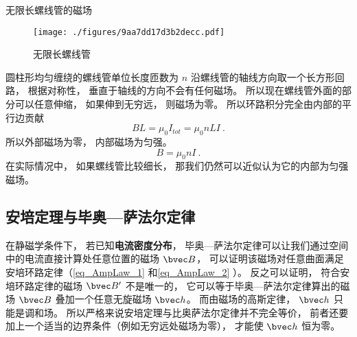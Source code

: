 \begin{example}{无限长螺线管的磁场}\label{ex_AmpLaw_2}
\begin{figure}[ht]
\centering
\texttt{[image: ./figures/9aa7dd17d3b2decc.pdf]}
\caption{无限长螺线管} \label{fig_AmpLaw_1}
\end{figure}
圆柱形均匀缠绕的螺线管单位长度匝数为 $n$ 沿螺线管的轴线方向取一个长方形回路， 根据对称性， 垂直于轴线的方向不会有任何磁场。 所以现在螺线管外面的部分可以任意伸缩， 如果伸到无穷远， 则磁场为零。 所以环路积分完全由内部的平行边贡献
\begin{equation}
BL = \mu_0 I_{tot} = \mu_0 nLI~.
\end{equation}
所以外部磁场为零， 内部磁场为匀强。
\begin{equation}
B = \mu_0 nI~.
\end{equation}
在实际情况中， 如果螺线管比较细长， 那我们仍然可以近似认为它的内部为匀强磁场。
\end{example}

\subsection{安培定理与毕奥—萨法尔定律}

在静磁学条件下， 若已知\textbf{电流密度分布}， 毕奥—萨法尔定律可以让我们通过空间中的电流直接计算处任意位置的磁场 $\bvec B$， 可以证明该磁场对任意曲面满足安培环路定律（\autoref{eq_AmpLaw_1} 和\autoref{eq_AmpLaw_2} ）。 反之可以证明， 符合安培环路定律的磁场 $\bvec B'$ 不是唯一的， 它可以等于毕奥—萨法尔定律算出的磁场 $\bvec B$ 叠加一个任意无旋磁场 $\bvec h$。 而由磁场的高斯定律， $\bvec h$ 只能是调和场。 所以严格来说安培定理与比奥萨法尔定律并不完全等价， 前者还要加上一个适当的边界条件（例如无穷远处磁场为零）， 才能使 $\bvec h$ 恒为零。
